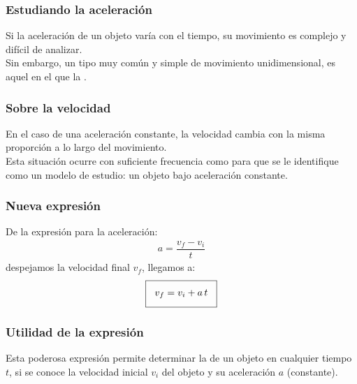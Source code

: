 \documentclass[14pt]{beamer}
\begin{document}
\begin{frame}
\frametitle{Estudiando la aceleración}
Si la aceleración de un objeto varía con el tiempo, su movimiento es complejo y difícil de analizar.
\\
\bigskip
\pause
Sin embargo, un tipo muy común y simple de movimiento unidimensional, es aquel en el que la .
\end{frame}
\begin{frame}
\frametitle{Sobre la velocidad}
En el caso de una aceleración constante, la velocidad cambia con la misma proporción a lo largo del movimiento.
\\
\bigskip
\pause
Esta situación ocurre con suficiente frecuencia como para que se le identifique como un modelo de estudio: un objeto bajo aceleración constante.
\end{frame}
\begin{frame}
\frametitle{Nueva expresión}
De la expresión para la aceleración:
\pause
\begin{align*}
a = \dfrac{v_{f} - v_{i}}{t}
\end{align*}
despejamos la velocidad final $v_{f}$, llegamos a:
\pause
\begin{align*}
\setlength{\fboxsep}{3\fboxsep}\boxed{
v_{f} = v_{i} + a \, t }
\end{align*}
\end{frame}
\begin{frame}
\frametitle{Utilidad de la expresión}
Esta poderosa expresión permite determinar la  de un objeto en cualquier tiempo $t$, si se conoce la velocidad inicial $v_{i}$ del objeto y su aceleración $a$ (constante).
\end{frame}
\end{document}
